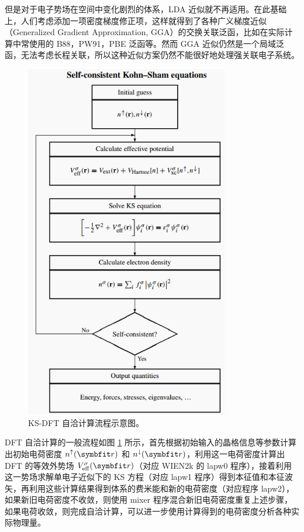 但是对于电子势场在空间中变化剧烈的体系，LDA 近似就不再适用。在此基础上，人们考虑添加一项密度梯度修正项，这样就得到了各种广义梯度近似（Generalized Gradient Approximation, GGA）的交换关联泛函，比如在实际计算中常使用的 B88\cite{B88}，PW91\cite{PW91}，PBE\cite{PBE} 泛函等。然而 GGA 近似仍然是一个局域泛函，无法考虑长程关联，所以这种近似方案仍然不能很好地处理强关联电子系统。
\begin{figure}[H]
    \vspace{13pt} %
    \centering
    \includegraphics[width=3.5in]{Img/ks-scf.png}
    \caption{KS-DFT 自洽计算流程示意图\cite{martin_2004}。}
    \label{KS-scf} 
\end{figure}
DFT 自洽计算的一般流程如图 \ref{KS-scf} 所示，首先根据初始输入的晶格信息等参数计算出初始电荷密度 $n^{\ua}(\vct{r})$ 和 $n^\da(\vct{r})$，利用这一电荷密度计算出 DFT 的等效外势场 $V_{\fun{eff}}^{\sigma}(\vct{r})$（对应 WIEN2k 的 lapw0 程序），接着利用这一势场求解单电子近似下的 KS 方程（对应 lapw1 程序）得到本征值和本征波矢，再利用这些计算结果得到体系的费米能和新的电荷密度（对应程序 lapw2），如果新旧电荷密度不收敛，则使用 mixer 程序混合新旧电荷密度重复上述步骤，如果电荷收敛，则完成自洽计算，可以进一步使用计算得到的电荷密度分析各种实际物理量。

